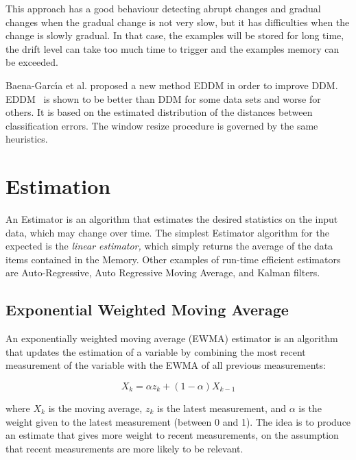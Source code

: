 This approach has a good behaviour detecting abrupt changes and gradual
changes when the gradual change is not very slow, but it has difficulties when
the change is slowly gradual. In that case, the examples will be stored for long
time, the drift level can take too much time to trigger and the examples memory
can be exceeded.

Baena-Garc\'{\i}a et al. proposed a new method EDDM in order to improve DDM. 
EDDM~\cite{EDDM} is shown to be better
than DDM for some data sets and worse for others. It is based on the 
estimated distribution of the distances between classification errors.
The window resize procedure is governed by the same heuristics.


\label{Ssochange}


\section{Estimation}

An Estimator is an algorithm that estimates the desired statistics on the input data, which
may change over time. %
The simplest Estimator algorithm for the expected is the {\em linear estimator,}
which simply returns the average of the data items contained in the Memory. 
Other examples of run-time efficient estimators are 
Auto-Regressive, Auto Regressive Moving Average, and Kalman filters. 

\subsection{Exponential Weighted Moving Average}
\label{Ssewma}


An exponentially weighted moving average (EWMA) estimator is 
an algorithm that updates the estimation of a variable by combining the most 
recent measurement of the variable with the EWMA of all previous measurements:

$$ X_k=\alpha z_k + (1 -\alpha) X_{k-1}$$ 

where $X_k$ is the moving average, $z_k$ is the latest measurement, and $\alpha$
 is the weight given to the latest measurement (between 0 and 1). 
The idea is to produce an estimate that gives more weight to recent measurements, 
on the assumption that recent measurements are more likely to be relevant. 



